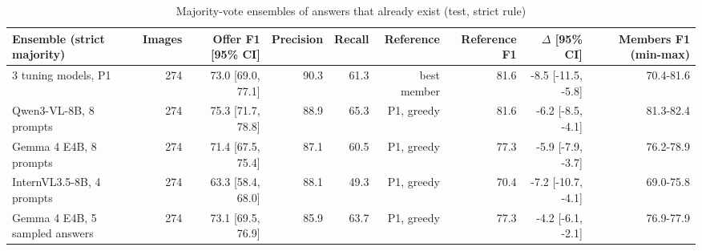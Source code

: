 \begin{table}[t]
\centering
\caption{Majority-vote ensembles of answers that already exist (test, strict rule)}
\label{tab:ensembles}
\small
\begin{tabular}{lrrrrrrrr}
\toprule
Ensemble (strict majority) & Images & Offer F1 [95\% CI] & Precision & Recall & Reference & Reference F1 & $\Delta$ [95\% CI] & Members F1 (min-max) \\
\midrule
3 tuning models, P1 & 274 & 73.0 [69.0, 77.1] & 90.3 & 61.3 & best member & 81.6 & -8.5 [-11.5, -5.8] & 70.4-81.6 \\
Qwen3-VL-8B, 8 prompts & 274 & 75.3 [71.7, 78.8] & 88.9 & 65.3 & P1, greedy & 81.6 & -6.2 [-8.5, -4.1] & 81.3-82.4 \\
Gemma 4 E4B, 8 prompts & 274 & 71.4 [67.5, 75.4] & 87.1 & 60.5 & P1, greedy & 77.3 & -5.9 [-7.9, -3.7] & 76.2-78.9 \\
InternVL3.5-8B, 4 prompts & 274 & 63.3 [58.4, 68.0] & 88.1 & 49.3 & P1, greedy & 70.4 & -7.2 [-10.7, -4.1] & 69.0-75.8 \\
Gemma 4 E4B, 5 sampled answers & 274 & 73.1 [69.5, 76.9] & 85.9 & 63.7 & P1, greedy & 77.3 & -4.2 [-6.1, -2.1] & 76.9-77.9 \\
\bottomrule
\end{tabular}
\par{}
\end{table}
